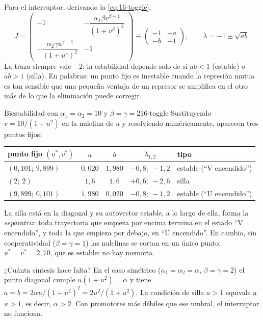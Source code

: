 Para el interruptor, derivando la \cref{eq:16-toggle},
\[
J=\begin{pmatrix}-1 & -\dfrac{\alpha_1\beta v^{\beta-1}}{(1+v^\beta)^2}\\[10pt] -\dfrac{\alpha_2\gamma u^{\gamma-1}}{(1+u^\gamma)^2} & -1\end{pmatrix}
\equiv\begin{pmatrix}-1 & -a\\ -b & -1\end{pmatrix},
\qquad \lambda=-1\pm\sqrt{ab}.
\]
La traza siempre vale $-2$; la estabilidad depende solo de si $ab<1$ (estable) o $ab>1$ (silla). En palabras: un punto fijo es inestable cuando la represión mutua es tan sensible que una pequeña ventaja de un represor se amplifica en el otro más de lo que la eliminación puede corregir.

\begin{ejemplo}{Biestabilidad con $\alpha_1=\alpha_2=10$ y $\beta=\gamma=2$}{16-toggle}
Sustituyendo $v=10/(1+u^2)$ en la nulclina de $u$ y resolviendo numéricamente, aparecen tres puntos fijos:
\begin{center}
\small
\begin{tabular}{@{}lcccl@{}}
\toprule
punto fijo $(u^*,v^*)$ & $a$ & $b$ & $\lambda_{1,2}$ & tipo\\
\midrule
$(0{,}101;\ 9{,}899)$ & $0{,}020$ & $1{,}980$ & $-0{,}8;\ -1{,}2$ & estable (``V encendido'')\\
$(2;\ 2)$ & $1{,}6$ & $1{,}6$ & $+0{,}6;\ -2{,}6$ & silla\\
$(9{,}899;\ 0{,}101)$ & $1{,}980$ & $0{,}020$ & $-0{,}8;\ -1{,}2$ & estable (``U encendido'')\\
\bottomrule
\end{tabular}
\end{center}
La silla está en la diagonal y su autovector estable, a lo largo de ella, forma la \emph{separatriz}: toda trayectoria que empieza por encima termina en el estado ``V encendido'', y toda la que empieza por debajo, en ``U encendido''. En cambio, sin cooperatividad ($\beta=\gamma=1$) las nulclinas se cortan en un único punto, $u^*=v^*=2{,}70$, que es estable: no hay memoria.

¿Cuánta síntesis hace falta? En el caso simétrico ($\alpha_1=\alpha_2=\alpha$, $\beta=\gamma=2$) el punto diagonal cumple $u(1+u^2)=\alpha$ y tiene $a=b=2\alpha u/(1+u^2)^2=2u^2/(1+u^2)$. La condición de silla $a>1$ equivale a $u>1$, es decir, $\alpha>2$. Con promotores más débiles que ese umbral, el interruptor no funciona.
\end{ejemplo}

